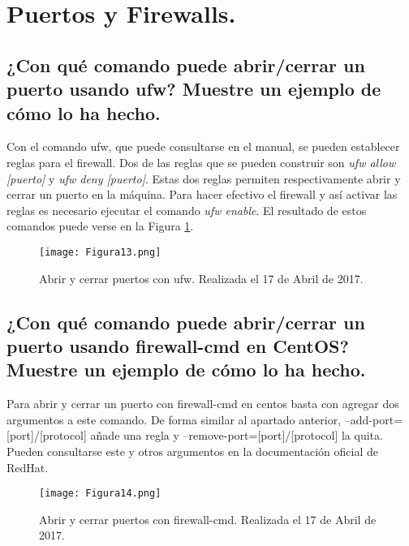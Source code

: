 
\section{Puertos y Firewalls.}


\subsection{¿Con qué comando puede abrir/cerrar un puerto usando ufw? Muestre un ejemplo de cómo lo ha hecho.}

Con el comando ufw, que puede consultarse en el manual\cite{manufw}, se pueden establecer reglas para el firewall. Dos de las reglas que se pueden construir son
\textit{ufw allow [puerto]} y \textit{ufw deny [puerto]}. Estas dos reglas permiten respectivamente abrir y cerrar un puerto en la máquina. Para hacer efectivo el firewall y
así activar las reglas es necesario ejecutar el comando \textit{ufw enable}. El resultado de estos comandos puede verse en la Figura \ref{fig:figura13}.

\begin{figure}[H] 
\centering
\texttt{[image: Figura13.png]}  
\caption{Abrir y cerrar puertos con ufw. Realizada el 17 de Abril de 2017.} \label{fig:figura13}
\end{figure}

\vspace{6mm}

\subsection{¿Con qué comando puede abrir/cerrar un puerto usando firewall-cmd en CentOS? Muestre un ejemplo de cómo lo ha hecho.}

Para abrir y cerrar un puerto con firewall-cmd en centos basta con agregar dos argumentos a este comando. De forma similar al apartado anterior, --add-port=[port]/[protocol] 
añade una regla y --remove-port=[port]/[protocol] la quita. Pueden consultarse este y otros argumentos en la documentación oficial de RedHat\cite{redports}.

\begin{figure}[H] 
\centering
\texttt{[image: Figura14.png]}  
\caption{Abrir y cerrar puertos con firewall-cmd. Realizada el 17 de Abril de 2017.} \label{fig:figura14}
\end{figure}

